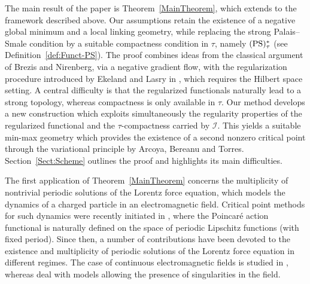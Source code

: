 \documentclass{article}
\newcommand{\boI}{\mathcal{I}}
\newcommand{\PS}{(\textnormal{PS})^{*}_\tau}
\theoremstyle{definition}
\begin{document}
The main result of the paper is Theorem~\ref{MainTheorem}, which extends \cite[Theorem 4]{Bre-Nir} to the framework described above. Our assumptions retain the existence of a negative global minimum and a local linking geometry, while replacing the strong Palais--Smale condition by a suitable compactness condition in $\tau$, namely $\PS$ (see Definition~\ref{def:Funct-PS}). The proof combines ideas from the classical argument of Brezis and Nirenberg, via a negative gradient flow, with the regularization procedure introduced by Ekeland and Lasry in \cite{Eke-Las}, which requires the Hilbert space setting. A central difficulty is that the regularized functionals naturally lead to a strong topology, whereas compactness is only available in $\tau$. Our method develops a new construction which exploits simultaneously the regularity properties of the regularized functional and the $\tau$-compactness carried by $\boI$. This yields a suitable min-max geometry which provides the existence of a second nonzero critical point through the variational principle \cite[Theorem 1]{ABT} by Arcoya, Bereanu and Torres. Section~\ref{Sect:Scheme} outlines the proof and highlights its main difficulties.


The first application of Theorem~\ref{MainTheorem} concerns the multiplicity of nontrivial periodic solutions of the Lorentz force equation, which models the dynamics of a charged particle in an electromagnetic field. Critical point methods for such dynamics were recently initiated in \cite{ABT}, where the Poincaré action functional \cite{Po2} is naturally defined on the space of periodic Lipschitz functions (with fixed period). Since then, a number of contributions have been devoted to the existence and multiplicity of periodic solutions of the Lorentz force equation in different regimes. The case of continuous electromagnetic fields is studied in \cite{ABT2,Ber2,Ber-Pir}, whereas \cite{AS,Ber1,BosDamPap,GLM,GT} deal with models allowing the presence of singularities in the field.
\end{document}
